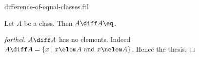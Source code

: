 \documentclass{naproche-library}
\begin{document}
\begin{smodule}[title=Difference of Equal Classes]{difference-of-equal-classes.ftl}


\begin{proposition}[forthel,id=DifferenceOfEqualClassesProp]
  Let $A$ be a class.
  Then $A \diff A \eq \empty$.
\end{proposition}
\begin{proof}[forthel]
  $A \diff A$ has no elements.
  Indeed $A \diff A = \{ x \mid x \elem A\text{ and }x \nelem A \}$.
  Hence the thesis.
\end{proof}

\end{smodule}
\end{document}
